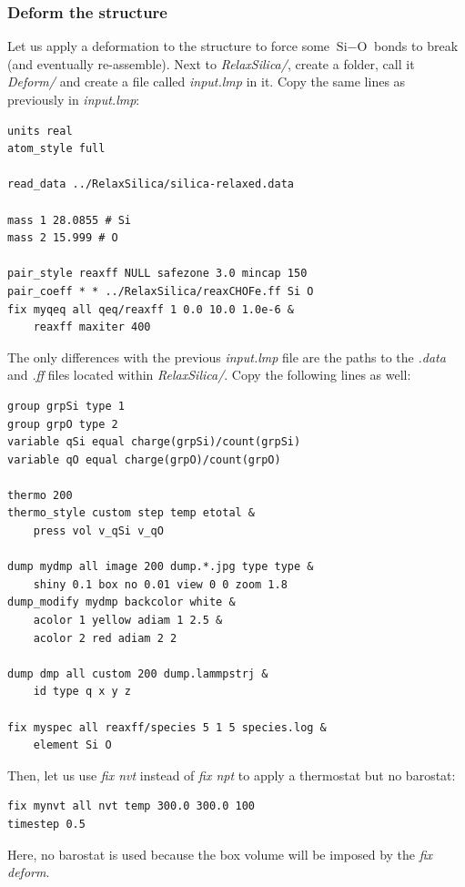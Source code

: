 \documentclass[9pt,tutorial]{livecoms}
\begin{document}
\subsubsection{Deform the structure}
Let us apply a deformation to the structure to force some $\text{Si}-\text{O}$
bonds to break (and eventually re-assemble). Next to \textit{RelaxSilica/},
create a folder, call it \textit{Deform/} and create a file called \textit{input.lmp}
in it. Copy the same lines as previously in \textit{input.lmp}:
{\normalsize \begin{verbatim}
units real
atom_style full

read_data ../RelaxSilica/silica-relaxed.data

mass 1 28.0855 # Si
mass 2 15.999 # O

pair_style reaxff NULL safezone 3.0 mincap 150
pair_coeff * * ../RelaxSilica/reaxCHOFe.ff Si O
fix myqeq all qeq/reaxff 1 0.0 10.0 1.0e-6 &
    reaxff maxiter 400
\end{verbatim}}
The only differences with the previous \textit{input.lmp} file are the paths to
the \textit{.data} and \textit{.ff} files located within \textit{RelaxSilica/}.
Copy the following lines as well:
{\normalsize \begin{verbatim}
group grpSi type 1
group grpO type 2
variable qSi equal charge(grpSi)/count(grpSi)
variable qO equal charge(grpO)/count(grpO)

thermo 200
thermo_style custom step temp etotal &
    press vol v_qSi v_qO

dump mydmp all image 200 dump.*.jpg type type &
    shiny 0.1 box no 0.01 view 0 0 zoom 1.8
dump_modify mydmp backcolor white &
    acolor 1 yellow adiam 1 2.5 &
    acolor 2 red adiam 2 2

dump dmp all custom 200 dump.lammpstrj &
    id type q x y z

fix myspec all reaxff/species 5 1 5 species.log &
    element Si O
\end{verbatim}}
Then, let us use \textit{fix nvt} instead of \textit{fix npt} to apply a
thermostat but no barostat:
{\normalsize \begin{verbatim}
fix mynvt all nvt temp 300.0 300.0 100
timestep 0.5
\end{verbatim}}
Here, no barostat is used because the box volume will be imposed by the \textit{fix deform}.
\end{document}

